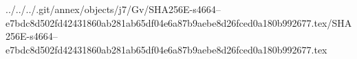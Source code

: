 ../../../.git/annex/objects/j7/Gv/SHA256E-s4664--e7bdc8d502fd42431860ab281ab65df04e6a87b9aebe8d26fced0a180b992677.tex/SHA256E-s4664--e7bdc8d502fd42431860ab281ab65df04e6a87b9aebe8d26fced0a180b992677.tex